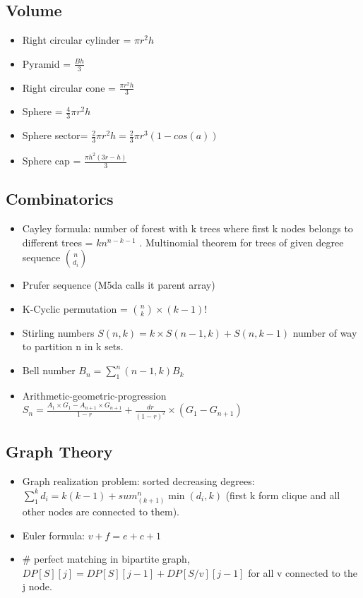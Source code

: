 \subsection{Volume}
\begin{itemize}
\item Right circular cylinder = $\pi r^2 h$ 
\item Pyramid = $\frac{Bh}{3}$
\item Right circular cone = $\frac{\pi r^2 h}{3}$
\item Sphere = $\frac{4}{3} \pi r^2 h$
\item Sphere sector= $\frac{2}{3} \pi r^2h = \frac{2}{3} \pi r^3 (1-cos(a))$
\item Sphere cap = $\frac{\pi h^2 (3r-h)}{3}$
\end{itemize}
\hrulefill
\subsection{Combinatorics}
\begin{itemize}
\item Cayley formula: number of forest with k trees where first k nodes belongs to different trees = $k n^{n-k-1}$ . Multinomial theorem for trees of given degree sequence ${\binom{n}{d_i}}$
\item Prufer sequence (M5da calls it parent array)
\item  K-Cyclic permutation = ${\binom{n}{k}} \times (k-1)!$
\item Stirling numbers $S(n,k) = k \times S(n-1,k) + S(n,k-1)$ number of way to partition n in k sets.
\item Bell number $B_n = \sum_1^n (n-1, k) B_k$ 
\item Arithmetic-geometric-progression $S_n = \frac{A_1 \times G_1 - A_{n+1} \times G_{n+1}}{1-r} + \frac{dr}{(1-r)^2} \times (G_1-G_{n+1})$
\end{itemize}
\hrulefill
\subsection{Graph Theory}
\begin{itemize}
\item Graph realization problem: sorted decreasing degrees: $\sum_1^k d_i = k(k-1)+sum_(k+1)^n \min(d_i,k)$ (first k form clique and all other nodes are connected to them).
\item Euler formula: $v+f = e+c+1$
\item \# perfect matching in bipartite graph, $DP[S][j] = DP[S][j-1] + DP[S/{v}][j-1]$ for all v connected to the j node.
\end{itemize}
\hrulefill
